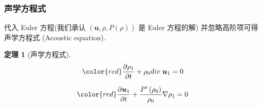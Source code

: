 \documentclass[aspectratio=2516]{beamer}
\newtheorem{thm}{\kaishu 定理}
\begin{document}

\begin{frame}
\frametitle{\kaishu 声学方程式}

\kaishu 

代入 Euler 方程(我们承认 $ (\boldsymbol{u}, \rho, P(\rho)) $ 是 Euler 方程的解) 并忽略高阶项可得声学方程式 (Acoustic equation).

\vspace{0.15cm}

\begin{thm}[\kaishu 声学方程式]
	\begin{equation}
	\color{red}
	\frac{{\partial {\rho _1}}}{{\partial t}} + {\rho _0}div\;{\boldsymbol{u}_1} = 0
	\label{eq5.1.26}
	\end{equation}

\vspace{0.15cm}	
	
	\begin{equation}
	\color{red}
	\frac{{\partial {\boldsymbol{u}_1}}}{{\partial t}} + \frac{{P^{\prime}\left( {{\rho _0}} \right)}}{{{\rho _0}}}\nabla {\rho _1} = 0
	\label{eq5.1.27}
	\end{equation}
\end{thm}

\end{frame}

\end{document}
